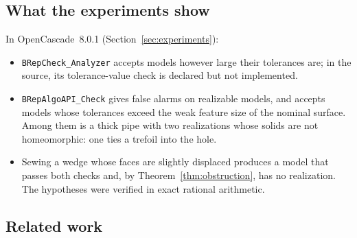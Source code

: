 \subsection{What the experiments show}
In OpenCascade~8.0.1 (Section~\ref{sec:experiments}):
\begin{itemize}
\item \texttt{BRepCheck\_Analyzer} accepts models however large their tolerances are; in the source, its
tolerance-value check is declared but not implemented.
\item \texttt{BRepAlgoAPI\_Check} gives false alarms on realizable models, and accepts models whose tolerances
exceed the weak feature size of the nominal surface. Among them is a thick pipe with two realizations whose solids
are not homeomorphic: one ties a trefoil into the hole.
\item Sewing a wedge whose faces are slightly displaced produces a model that passes both checks and, by
Theorem~\ref{thm:obstruction}, has no realization. The hypotheses were verified in exact rational arithmetic.
\end{itemize}

\subsection{Related work}

